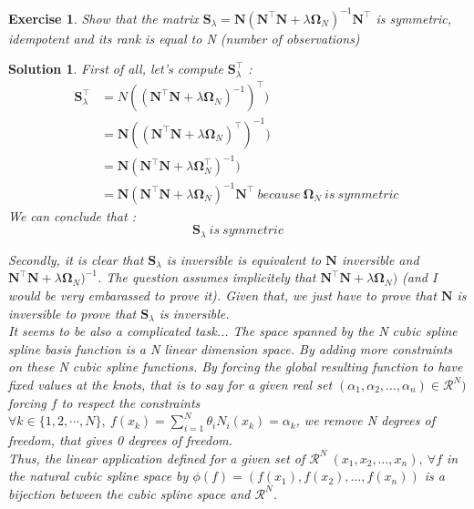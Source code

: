 \documentclass[12pt,a4paper]{article}
\def\R{\mathcal{R}}%
\newtheorem{exercise}{Exercise}
\newtheorem{solution}{Solution}
\begin{document}
\begin{exercise}
Show that the matrix $\boldsymbol S_\lambda = \boldsymbol N(\boldsymbol N^\top \boldsymbol N + \lambda \boldsymbol \Omega_N)^{-1} \boldsymbol N^\top$ is symmetric, idempotent and its rank is equal to N (number of observations)
\end{exercise}
\begin{solution}
First of all, let's compute $\boldsymbol S_\lambda^\top$ : \\
\begin{equation}
\begin{split}
\boldsymbol S_\lambda^\top & = N((\boldsymbol N^\top \boldsymbol N + \lambda \boldsymbol \Omega_N)^{-1})^\top)\\
 & = \boldsymbol N((\boldsymbol N^\top \boldsymbol N + \lambda \boldsymbol \Omega_N)^{\top})^{-1}) \\
 & = \boldsymbol N(\boldsymbol N^\top \boldsymbol N + \lambda \boldsymbol \Omega_N^{\top})^{-1})\\
 & = \boldsymbol N(\boldsymbol N^\top \boldsymbol N + \lambda \boldsymbol \Omega_N)^{-1} \boldsymbol N^\top\ because\ \boldsymbol \Omega_N\ is\ symmetric\
\end{split}
\end{equation}
We can conclude that : $$\boxed{\boldsymbol S_\lambda\ is\ symmetric}$$

Secondly, it is clear that $\boldsymbol S_\lambda$ is inversible is equivalent to $\boldsymbol N$ inversible and $\boldsymbol N^\top \boldsymbol N + \lambda \boldsymbol \Omega_N)^{-1}$. The question assumes implicitely that $\boldsymbol N^\top \boldsymbol N + \lambda \boldsymbol \Omega_N)$ (and I would be very embarassed to prove it). Given that, we just have to prove that $\boldsymbol N$ is inversible to prove that $\boldsymbol S_\lambda$ is inversible.\\

It seems to be also a complicated task...
The space spanned by the N cubic spline spline basis function is a N linear dimension space. By adding more constraints on these N cubic spline functions. By forcing the global resulting function to have fixed values at the knots, that is to say for a given real set $(\alpha_1, \alpha_2, \ldots, \alpha_n) \in \R^N)$ forcing $f$ to respect the constraints $\forall k \in \{1,2,\cdots, N\},\ f(x_k) = \sum_{i=1}^N \theta_i N_i(x_k) = \alpha_k$, we remove N degrees of freedom, that gives 0 degrees of freedom.\\

Thus, the linear application defined for a given set of $\R^N \ (x_1, x_2, \ldots, x_n),\ \forall f$ in the natural cubic spline space by $\phi(f) = (f(x_1), f(x_2), \ldots, f(x_n))$ is a bijection between the cubic spline space and $\R^N$.\\


\end{solution}
\end{document}
